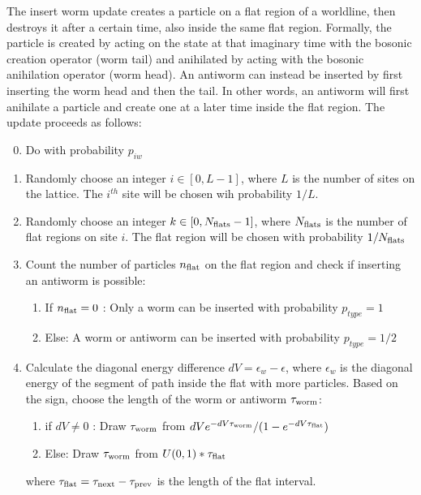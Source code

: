 \documentclass[12pt, two sided]{article}
\begin{document}
    The insert worm update creates a particle on a flat region of a worldline, then destroys it after a certain time, also inside the same flat region. Formally, the particle is created by acting on the state at that imaginary time with the bosonic creation operator (worm tail) and anihilated by acting with the bosonic anihilation operator (worm head). An antiworm can instead be inserted by first inserting the worm head and then the tail. In other words, an antiworm will first anihilate a particle and create one at a later time inside the flat region. The update proceeds as follows:
%
    \begin{enumerate}
        \setcounter{enumi}{-1}
    \item Do with probability $p_{iw}$
        \item Randomly choose an integer $i \in [0,L-1]$, where $L$ is the number of sites on the lattice. The $i^{th}$ site will be chosen wih probability $1/L$.
        \item Randomly choose an integer $k \in [0,N_{\rm{flats}} - 1]$, where $N_{\rm{flats}}$ is the number of flat regions on site $i$. The flat region will be chosen with probability $1/N_{\rm{flats}}$
        \item Count the number of particles $n_{\rm{flat}}$ on the flat region and check if inserting an antiworm is possible:
            \begin{enumerate}
            \item If $n_{\rm{flat}} = 0$ : Only a worm can be inserted with probability $p_{type} = 1$
            \item Else: A worm or antiworm can be inserted with probability $p_{type} = 1/2$
            \end{enumerate}
        \item Calculate the diagonal energy difference $dV = \epsilon_w - \epsilon$, where $\epsilon_w$ is the diagonal energy of the segment of path inside the flat with more particles. Based on the sign, choose the length of the worm or antiworm $\tau_{\rm{worm}}$:
        	     \begin{enumerate}
	     \item{if $dV \neq 0$ : Draw $\tau_{\rm{worm}}$ from $dV e^{-dV\tau_{\rm{worm}}}/(1-e^{-dV \tau_{\rm{flat}}})$}
	     \item{Else: Draw $\tau_{\rm{worm}}$ from $U(0,1)*\tau_{\rm{flat}}$}
	     \end{enumerate}
	     where $\tau_{\rm{flat}} = \tau_{\rm{next}}-\tau_{\rm{prev}}$ is the length of the flat interval.

\end{enumerate}
\end{document}

